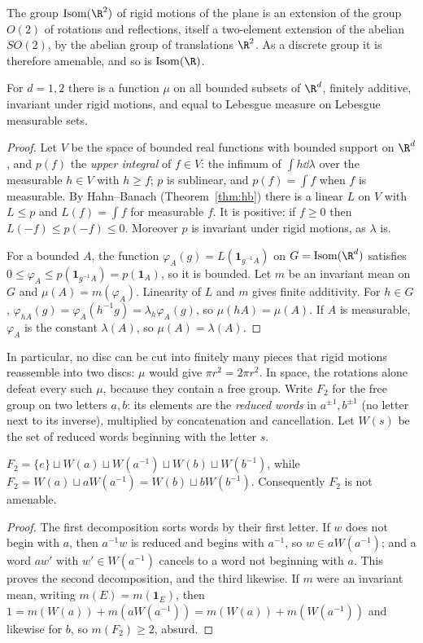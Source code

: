 The group $\mathrm{Isom}(\R^2)$ of rigid motions of the plane is an extension of the group $O(2)$ of rotations and reflections, itself a
two-element extension of the abelian $SO(2)$, by the abelian group of translations $\R^2$. As a discrete group it is therefore amenable, and so is $\mathrm{Isom}(\R)$.

\begin{theorem}[Banach, 1923]\label{thm:banachmeasure}
For $d=1,2$ there is a function $\mu$ on all bounded subsets of $\R^d$, finitely additive, invariant under rigid motions, and equal to Lebesgue measure on
Lebesgue measurable sets.
\end{theorem}
\begin{proof}
Let $V$ be the space of bounded real functions with bounded support on $\R^d$, and $p(f)$ the \emph{upper integral} of $f\in V$: the infimum of $\int h\dd\lambda$ over the
measurable $h\in V$ with $h\ge f$; $p$ is sublinear, and $p(f)=\int f$ when $f$ is measurable. By Hahn--Banach (Theorem~\ref{thm:hb}) there is a linear $L$ on $V$ with $L\le p$ and $L(f)=\int f$
for measurable $f$. It is positive: if $f\ge0$ then $L(-f)\le p(-f)\le0$. Moreover $p$ is invariant under rigid motions, as $\lambda$ is.

For a bounded $A$, the function $\varphi_A(g)=L(\mathbf 1_{g^{-1}A})$ on $G=\mathrm{Isom}(\R^d)$ satisfies $0\le\varphi_A\le p(\mathbf 1_{g^{-1}A})=p(\mathbf 1_A)$, so it is bounded. Let $m$ be an invariant
mean on $G$ and $\mu(A)=m(\varphi_A)$. Linearity of $L$ and $m$ gives finite additivity. For $h\in G$, $\varphi_{hA}(g)=\varphi_A(h^{-1}g)=\lambda_h\varphi_A(g)$, so $\mu(hA)=\mu(A)$. If
$A$ is measurable, $\varphi_A$ is the constant $\lambda(A)$, so $\mu(A)=\lambda(A)$.
\end{proof}

In particular, no disc can be cut into finitely many pieces that rigid motions reassemble into two discs: $\mu$ would give $\pi r^2=2\pi r^2$. In space, the
rotations alone defeat every such $\mu$, because they contain a free group. Write $F_2$ for the free group on two letters $a,b$: its elements are the
\emph{reduced words} in $a^{\pm1},b^{\pm1}$ (no letter next to its inverse), multiplied by concatenation and cancellation. Let $W(s)$ be the set of reduced words
beginning with the letter $s$.

\begin{proposition}\label{prop:f2paradox}
$F_2=\{e\}\sqcup W(a)\sqcup W(a^{-1})\sqcup W(b)\sqcup W(b^{-1})$, while $F_2=W(a)\sqcup aW(a^{-1})=W(b)\sqcup bW(b^{-1})$. Consequently $F_2$ is not amenable.
\end{proposition}
\begin{proof}
The first decomposition sorts words by their first letter. If $w$ does not begin with $a$, then $a^{-1}w$ is reduced and begins with $a^{-1}$, so $w\in aW(a^{-1})$;
and a word $aw'$ with $w'\in W(a^{-1})$ cancels to a word not beginning with $a$. This proves the second decomposition, and the third likewise. If $m$ were an
invariant mean, writing $m(E)=m(\mathbf 1_E)$, then $1=m(W(a))+m(aW(a^{-1}))=m(W(a))+m(W(a^{-1}))$ and likewise for $b$, so $m(F_2)\ge2$, absurd.
\end{proof}

